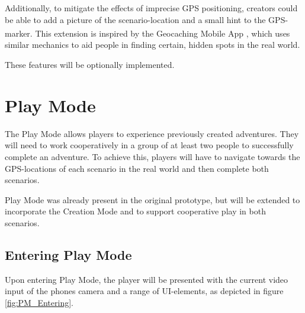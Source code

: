 \documentclass{sigchi-ext}
\begin{document}
Additionally, to mitigate the effects of imprecise GPS positioning, creators could be able to add a picture of the scenario-location and a small hint to the GPS-marker. This extension is inspired by the Geocaching\textsuperscript{\textregistered} Mobile App \cite{app:geocaching}, which uses similar mechanics to aid people in finding certain, hidden spots in the real world. 

These features will be optionally implemented.

\section{Play Mode}
\label{sec:Play}


The Play Mode allows players to experience previously created adventures. They will need to work cooperatively in a group of at least two people to successfully complete an adventure. To achieve this, players will have to navigate towards the GPS-locations of each scenario in the real world and then complete both scenarios. 

Play Mode was already present in the original prototype, but will be extended to incorporate the Creation Mode and to support cooperative play in both scenarios.

\subsection{Entering Play Mode}

Upon entering Play Mode, the player will be presented with the current video input of the phones camera and a range of UI-elements, as depicted in figure \ref{fig:PM_Entering}.
\end{document}
